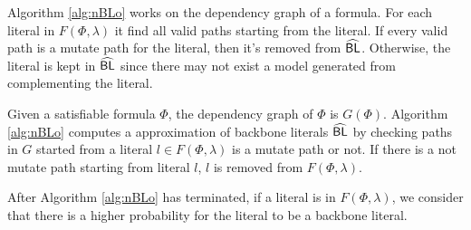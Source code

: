 Algorithm \ref{alg:nBLo} works on the dependency graph of a formula. For each literal in $F(\Phi, \lambda)$ it find all valid paths starting from the literal. If every valid path is a mutate path for the literal, then it's removed from ${\sf \widehat{BL}}$. Otherwise, the literal is kept in ${\sf \widehat{BL}}$ since there may not exist a model generated from complementing the literal.

Given a satisfiable formula $\Phi$, the dependency graph of $\Phi$ is $G(\Phi)$. Algorithm \ref{alg:nBLo} computes a approximation of backbone literals ${\sf \widehat{BL}}$ by checking paths in $G$ started from a literal $l\in F(\Phi, \lambda)$ is a mutate path or not. If there is a not mutate path starting from literal $l$, $l$ is removed from $F(\Phi, \lambda)$.

After Algorithm \ref{alg:nBLo} has terminated, if a literal is in $F(\Phi, \lambda)$, we consider that there is a higher probability for the literal to be a backbone literal.
